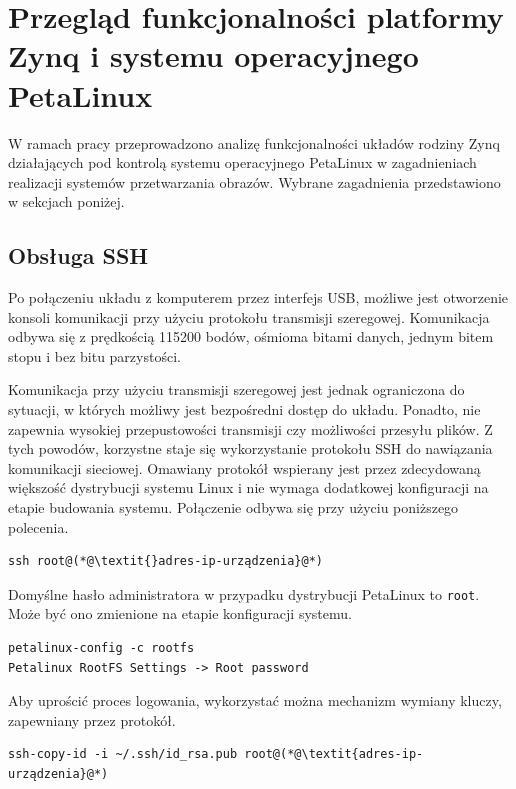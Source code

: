 \chapter{Przegląd funkcjonalności platformy Zynq i systemu operacyjnego PetaLinux}
\label{cha:functionalities}

W ramach pracy przeprowadzono analizę funkcjonalności układów rodziny Zynq działających pod kontrolą systemu operacyjnego PetaLinux w zagadnieniach realizacji systemów przetwarzania obrazów. Wybrane zagadnienia przedstawiono w sekcjach poniżej.

\section{Obsługa SSH}
\label{sec:ssh}
Po połączeniu układu z komputerem przez interfejs USB, możliwe jest otworzenie konsoli komunikacji przy użyciu protokołu transmisji szeregowej. Komunikacja odbywa się z prędkością 115200 bodów, ośmioma bitami danych, jednym bitem stopu i bez bitu parzystości.

Komunikacja przy użyciu transmisji szeregowej jest jednak ograniczona do sytuacji, w których możliwy jest bezpośredni dostęp do układu. Ponadto, nie zapewnia wysokiej przepustowości transmisji czy możliwości przesyłu plików. Z tych powodów, korzystne staje się wykorzystanie protokołu SSH do nawiązania komunikacji sieciowej.
Omawiany protokół wspierany jest przez zdecydowaną większość dystrybucji systemu Linux i nie wymaga dodatkowej konfiguracji na etapie budowania systemu. Połączenie odbywa się przy użyciu poniższego polecenia.

\begin{lstlisting}[breaklines=true]
ssh root@(*@\textit{}adres-ip-urządzenia}@*)
\end{lstlisting}

Domyślne hasło administratora w przypadku dystrybucji PetaLinux to \texttt{root}. Może być ono zmienione na etapie konfiguracji systemu.


\begin{lstlisting}[breaklines=true]
petalinux-config -c rootfs
Petalinux RootFS Settings -> Root password
\end{lstlisting}

Aby uprościć proces logowania, wykorzystać można mechanizm wymiany kluczy, zapewniany przez protokół.

\begin{lstlisting}[breaklines=true]
ssh-copy-id -i ~/.ssh/id_rsa.pub root@(*@\textit{adres-ip-urządzenia}@*)
\end{lstlisting}

